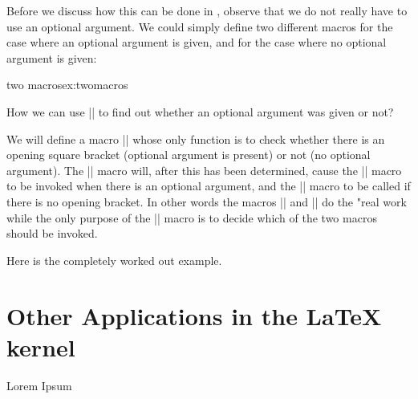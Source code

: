 Before we discuss how this can be done in \tex,
observe that we do not really have to use an
optional argument. We could simply define two
different macros  for the case where an
optional argument is given, and  for the
case where no optional argument is given:


\begin{texexample}{two macros}{ex:twomacros}
\def\xxWithOpt [#1]#2{...}
\def\xxNoOpt #1{...}
\def\xxWithOpt (#1)#2{\fbox{#2}}
\xxWithOpt (box){Testing}
\end{texexample}

How we can use |\futurelet| to find out
whether an optional argument was given or not?

We will define a macro |\xx| whose only function is
to check whether there is an opening square bracket
(optional argument is present) or not (no optional
argument). The |\xx| macro will, after this has been
determined, cause the |\xxWithOpt| macro to be invoked
when there is an optional argument, and the
|\xxNoOpt| macro to be called if there is no opening
bracket. In other words the macros |\xxWithOpt|
and |\xxNoOpt| do the "real work while the only
purpose of the |\xx| macro is to decide which of the
two macros should be invoked.


Here is the completely worked out example.


\begin{teX}
\def \xxWithOpt [#1] #2{...}
\def\xxNoOpt #2{...}

\def\xx {%
\futurelet\xxLookedAtToken
    \xxDecide
}

\def\xxDecide {%
 \ifx\xxLookedAtToken [%
\let\next = \xxWithOpt
\else
 \let\next = \xxNoOpt
 \fi
\next
}
\end{teX}

\section{Other Applications in the LaTeX kernel}

\begin{teX}
\def\elidebefore[#1]#2{[$\ldots$] #2}
\def\elideafter#1{#1$\ldots$}

\def\elide {%
\futurelet\ifoptions
    \choosemacro
}

\elide{Lorem Ipsum}

\elide[b]{Lorem ipsum}
\end{teX}

